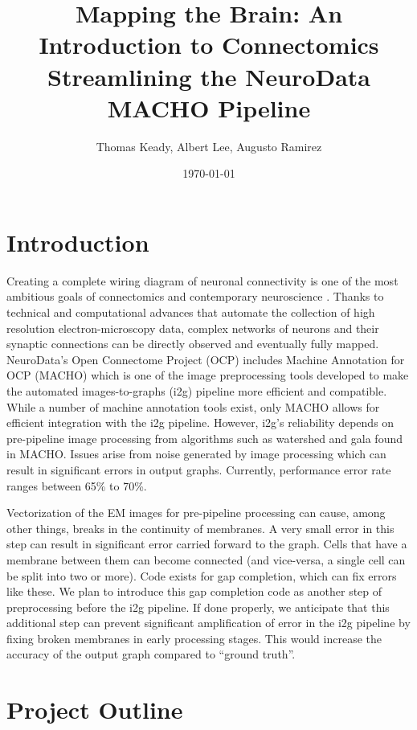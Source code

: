 \documentclass[11pt]{article}
\title{Mapping the Brain: An Introduction to Connectomics\\Streamlining the NeuroData MACHO Pipeline}
\author{Thomas Keady, Albert Lee, Augusto Ramirez}
\date{\today}
\begin{document}
\maketitle

\section{Introduction}

Creating a complete wiring diagram of neuronal connectivity is one of the most ambitious goals of connectomics and contemporary neuroscience \cite{roncal1}. Thanks to technical and computational advances that automate the collection of high resolution electron-microscopy data, complex networks of neurons and their synaptic connections can be directly observed and eventually fully mapped. NeuroData's Open Connectome Project (OCP) includes Machine Annotation for OCP (MACHO) which is one of the image preprocessing tools developed to make the automated images-to-graphs (i2g) pipeline more efficient and compatible. While a number of machine annotation tools exist, only MACHO allows for efficient integration with the i2g pipeline. However, i2g's reliability depends on pre-pipeline image processing from algorithms such as watershed and gala found in MACHO. Issues arise from noise generated by image processing which can result in significant errors in output graphs. Currently, performance error rate ranges between 65\% to 70\%.

Vectorization of the EM images for pre-pipeline processing can cause, among other things, breaks in the continuity of membranes. A very small error in this step can result in significant error carried forward to the graph. Cells that have a membrane between them can become connected (and vice-versa, a single cell can be split into two or more). Code exists for gap completion, which can fix errors like these. We plan to introduce this gap completion code as another step of preprocessing before the i2g pipeline. If done properly, we anticipate that this additional step can prevent significant amplification of error in the i2g pipeline by fixing broken membranes in early processing stages. This would increase the accuracy of the output graph compared to ``ground truth''. 

\section{Project Outline}
\end{document}
